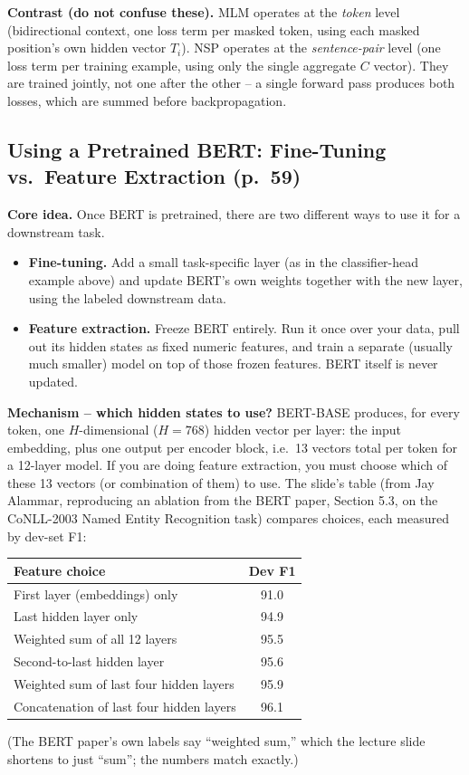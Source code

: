\documentclass[11pt]{article}
\begin{document}
\textbf{Contrast (do not confuse these).} MLM operates at the \emph{token} level (bidirectional context, one loss term per masked token, using each masked position's own hidden vector $T_i$). NSP operates at the \emph{sentence-pair} level (one loss term per training example, using only the single aggregate $C$ vector). They are trained jointly, not one after the other -- a single forward pass produces both losses, which are summed before backpropagation.

\subsection{Using a Pretrained BERT: Fine-Tuning vs.\ Feature Extraction (p.\ 59)}

\textbf{Core idea.} Once BERT is pretrained, there are two different ways to use it for a downstream task.

\begin{itemize}
\item \textbf{Fine-tuning.} Add a small task-specific layer (as in the classifier-head example above) and update BERT's own weights together with the new layer, using the labeled downstream data.
\item \textbf{Feature extraction.} Freeze BERT entirely. Run it once over your data, pull out its hidden states as fixed numeric features, and train a separate (usually much smaller) model on top of those frozen features. BERT itself is never updated.
\end{itemize}

\textbf{Mechanism -- which hidden states to use?} BERT-BASE produces, for every token, one $H$-dimensional ($H=768$) hidden vector per layer: the input embedding, plus one output per encoder block, i.e.\ 13 vectors total per token for a 12-layer model. If you are doing feature extraction, you must choose which of these 13 vectors (or combination of them) to use. The slide's table (from Jay Alammar, reproducing an ablation from the BERT paper, Section 5.3, on the CoNLL-2003 Named Entity Recognition task) compares choices, each measured by dev-set F1:

\begin{center}
\begin{tabular}{lc}
\toprule
Feature choice & Dev F1 \\
\midrule
First layer (embeddings) only & 91.0 \\
Last hidden layer only & 94.9 \\
Weighted sum of all 12 layers & 95.5 \\
Second-to-last hidden layer & 95.6 \\
Weighted sum of last four hidden layers & 95.9 \\
Concatenation of last four hidden layers & 96.1 \\
\bottomrule
\end{tabular}
\end{center}
(The BERT paper's own labels say ``weighted sum,'' which the lecture slide shortens to just ``sum''; the numbers match exactly.)
\end{document}
